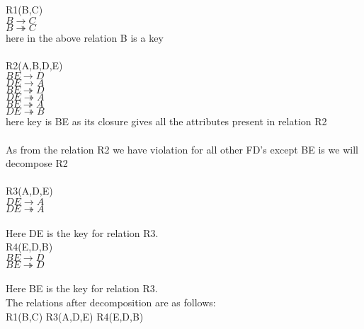  R1(B,C) \\
 $B \rightarrow C$\\
 $B \twoheadrightarrow C$\\
 here in the above relation B is a key \\ \\
 
 R2(A,B,D,E) \\ 
 $BE \rightarrow D$\\
 $DE \rightarrow A$\\
 $BE \twoheadrightarrow D$\\
 $DE \twoheadrightarrow A$\\
 $BE \twoheadrightarrow A$\\
 $DE \twoheadrightarrow B$\\
 here key is BE as its closure gives all the attributes present in relation R2\\ \\
 
 As from the relation R2 we have violation for all other FD's except BE is we will decompose R2\\ \\
 
 R3(A,D,E)\\
 $DE \rightarrow A$\\
 $DE \twoheadrightarrow A$\\ \\
 
 Here DE is the key for relation R3.\\ 
 
 R4(E,D,B)\\
 $BE \rightarrow D$\\
 $BE \twoheadrightarrow D$\\ \\
 Here BE is the key for relation R3.\\
 
 The relations after decomposition are as follows:\\ R1(B,C) R3(A,D,E) R4(E,D,B)